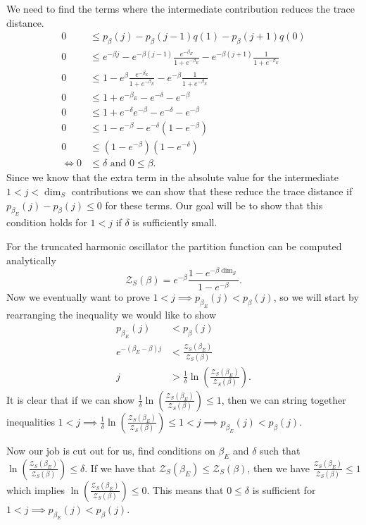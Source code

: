 \documentclass{article}
\newcommand{\parens}[1]{\left( #1 \right)}
\newcommand{\partfun}{\mathcal{Z}}
\begin{document}
We need to find the terms where the intermediate contribution reduces the trace distance.
\begin{align}
    0 &\leq p_{\beta}(j) - p_{\beta}(j-1) q(1) - p_{\beta}(j+1) q(0) \\
    0 &\leq e^{-\beta j} - e^{-\beta(j - 1)} \frac{e^{-\beta_E}}{1 + e^{-\beta_E}} - e^{-\beta(j+1)} \frac{1}{1 + e^{-\beta_E}} \\
    0 &\leq 1 - e^{\beta} \frac{e^{-\beta_E}}{1 + e^{-\beta_E}} - e^{-\beta} \frac{1}{1 + e^{-\beta_E}} \\
    0&\leq 1 + e^{-\beta_E} -e^{-\delta} - e^{-\beta} \\
    0 &\leq 1 + e^{-\delta} e^{-\beta} - e^{-\delta } - e^{-\beta} \\
    0 &\leq 1 - e^{-\beta} - e^{-\delta} (1 - e^{-\beta}) \\
    0 &\leq (1-e^{-\beta})(1 - e^{-\delta}) \\
    \iff 0 &\leq \delta \text{ and } 0 \leq \beta.
\end{align}
Since we know that the extra term in the absolute value for the intermediate $1 < j < \dim_S$ contributions we can show that these reduce the trace distance if $p_{\beta_E}(j) - p_{\beta}(j) \leq 0$ for these terms. Our goal will be to show that this condition holds for $1 < j$ if $\delta$ is sufficiently small. 

For the truncated harmonic oscillator the partition function can be computed analytically 
\begin{equation}
    \partfun_S(\beta) = e^{-\beta} \frac{1 - e^{-\beta \dim_S}}{1 - e^{-\beta}}.
\end{equation}
Now we eventually want to prove $1 < j \implies p_{\beta_E}(j) < p_{\beta}(j)$, so we will start by rearranging the inequality we would like to show
\begin{align}
    p_{\beta_E}(j) &< p_{\beta}(j) \\
    e^{-(\beta_E - \beta)j} &< \frac{\partfun_S(\beta_E)}{\partfun_S(\beta)} \\
    j &> \frac{1}{\delta} \ln\parens{\frac{\partfun_S(\beta_E)}{\partfun_S(\beta)}}.
\end{align}
It is clear that if we can show $\frac{1}{\delta} \ln \parens{\frac{\partfun_S(\beta_E)}{\partfun_S(\beta)}} \leq 1$, then we can string together inequalities $1 < j \implies \frac{1}{\delta}\ln \parens{\frac{\partfun_S(\beta_E)}{\partfun_S(\beta)}} \leq 1 < j \implies p_{\beta_E}(j) < p_{\beta}(j)$.

Now our job is cut out for us, find conditions on $\beta_E$ and $\delta$ such that $\ln \parens{\frac{\partfun_S(\beta_E)}{\partfun_S(\beta)}} \leq \delta$. If we have that $\partfun_S(\beta_E) \leq \partfun_S(\beta)$, then we have $\frac{\partfun_S(\beta_E)}{\partfun_S(\beta)} \leq 1$ which implies $\ln \parens{\frac{\partfun_S(\beta_E)}{\partfun_S(\beta)}} \leq 0$. This means that $0 \leq \delta$ is sufficient for $1 < j \implies p_{\beta_E}(j) < p_{\beta}(j)$. 
\end{document}
